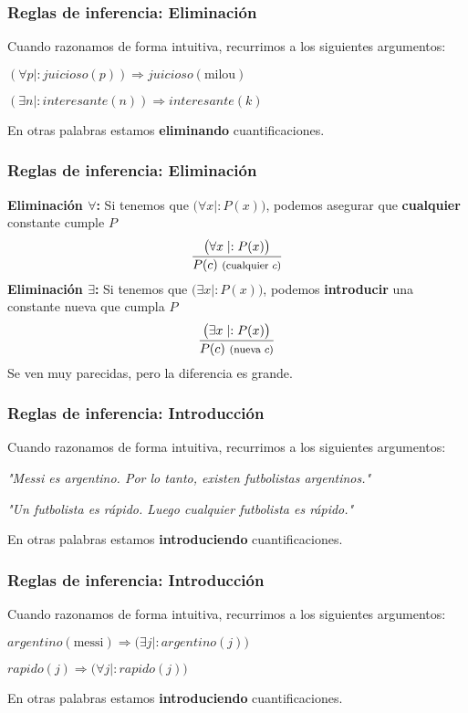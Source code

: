\documentclass{beamer}
\newcommand{\then}{\Rightarrow}
\begin{document}
\begin{frame}[fragile]
    \frametitle{Reglas de inferencia: Eliminación}
    Cuando razonamos de forma intuitiva, recurrimos a los siguientes argumentos:
    \begin{center}
        $(\forall p \mid : juicioso(p)) \then juicioso(\text{milou})$

        \vspace{10pt}

        $(\exists n \mid : interesante(n)) \then interesante(k)$
    \end{center}
    En otras palabras estamos \textbf{eliminando} cuantificaciones.
\end{frame}

\begin{frame}[fragile]
    \frametitle{Reglas de inferencia: Eliminación}
    \textbf{Eliminación $\forall$:} Si tenemos que $\big(\forall x \mid : P(x)\big)$, podemos asegurar que \textbf{cualquier} constante cumple $P$ 
        $$\frac{\big(\forall x \mid : P(x)\big)} {P(c)\ \text{\footnotesize(cualquier $c$)}}$$
    \textbf{Eliminación $\exists$:} Si tenemos que $\big(\exists x \mid : P(x)\big)$, podemos \textbf{introducir} una constante nueva que cumpla $P$
    $$\frac{\big(\exists x \mid : P(x)\big)} {P(c)\ \text{\footnotesize(nueva $c$)}}$$
    Se ven muy parecidas, pero la diferencia es grande.
\end{frame}

\begin{frame}[fragile]
    \frametitle{Reglas de inferencia: Introducción}
    Cuando razonamos de forma intuitiva, recurrimos a los siguientes argumentos:
    \begin{center}
        \textit{"Messi es argentino. Por lo tanto, existen futbolistas argentinos."}

        \vspace{10pt}

        \textit{"Un futbolista es rápido. Luego cualquier futbolista es rápido."}

    \end{center}
    En otras palabras estamos \textbf{introduciendo} cuantificaciones.
\end{frame}

\begin{frame}[fragile]
    \frametitle{Reglas de inferencia: Introducción}
    Cuando razonamos de forma intuitiva, recurrimos a los siguientes argumentos:
    \begin{center}
        $argentino(\text{messi}) \then \big(\exists j \mid : argentino(j)\big)$

        \vspace{10pt}

        $ rapido(j) \then \big(\forall j \mid : rapido(j)\big)$
    \end{center}
    En otras palabras estamos \textbf{introduciendo} cuantificaciones.
\end{frame}
\end{document}
